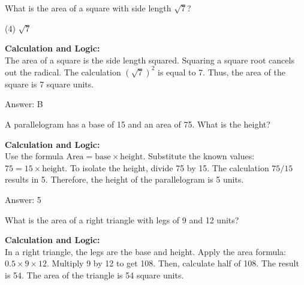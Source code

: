 \documentclass[11pt,paper=a4,answers]{exam}
\begin{document}
\begin{questions}
\vspace{60pt}

\question
What is the area of a square with side length $\sqrt{7}$?
\begin{tasks}(4)
    \task $\sqrt{7}$
\end{tasks}

\begin{solution}
\textbf{Calculation and Logic:} \\
The area of a square is the side length squared. Squaring a square root cancels out the radical. The calculation $(\sqrt{7})^2$ is equal to 7. Thus, the area of the square is 7 square units.

\vspace{30pt}

Answer: \colorbox{yellow!100}{B}
\end{solution}

\vspace{60pt}

\question
A parallelogram has a base of 15 and an area of 75. What is the height?

\begin{solution}
\textbf{Calculation and Logic:} \\
Use the formula $\text{Area} = \text{base} \times \text{height}$. Substitute the known values: $75 = 15 \times \text{height}$. To isolate the height, divide 75 by 15. The calculation $75 / 15$ results in 5. Therefore, the height of the parallelogram is 5 units.

\vspace{30pt}

Answer: \colorbox{yellow!100}{5}
\end{solution}

\vspace{60pt}

\question
What is the area of a right triangle with legs of 9 and 12 units?

\begin{solution}
\textbf{Calculation and Logic:} \\
In a right triangle, the legs are the base and height. Apply the area formula: $0.5 \times 9 \times 12$. Multiply 9 by 12 to get 108. Then, calculate half of 108. The result is 54. The area of the triangle is 54 square units.


\end{solution}
\end{questions}
\end{document}
